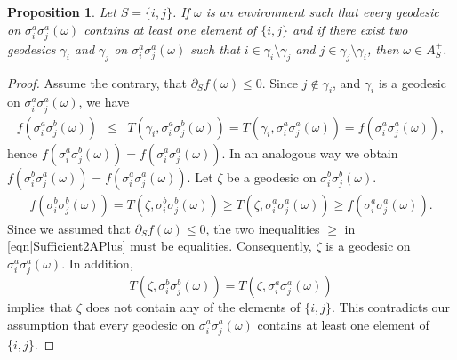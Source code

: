 \documentclass[reqno]{amsart}
\newtheorem{proposition}[theorem]{Proposition}
\begin{document}
\begin{proposition}\label{thm|Sufficient2APlus} 
Let $S=\{i,j\}$. If $\omega$ is an environment such that every geodesic on $\sigma_i^a\sigma_j^a(\omega)$ contains at least one element of $\{i,j\}$ and if there exist two geodesics $\gamma_i$ and $\gamma_j$ on $\sigma_i^a\sigma_j^a(\omega)$ such that $i\in \gamma_i\setminus \gamma_j$ and $j\in \gamma_j\setminus\gamma_i$, 
then $\omega\in A_{S}^+$.
\end{proposition}
\begin{proof} Assume the contrary, that $\partial_Sf(\omega)\leq 0$. Since $j\not\in \gamma_i$, and $\gamma_i$ is a geodesic on $\sigma_i^a\sigma_j^a(\omega)$, we have
\begin{eqnarray*}
f\left(\sigma_i^a\sigma_j^b(\omega)\right)&\leq& T\left(\gamma_i,\sigma_i^a\sigma_j^b(\omega)\right) =
 T\left(\gamma_i,\sigma_i^a\sigma_j^a(\omega)\right) =f\left(\sigma_i^a\sigma_j^a(\omega)\right),
\end{eqnarray*}
hence $f\left(\sigma_i^a\sigma_j^b(\omega)\right)=f\left(\sigma_i^a\sigma_j^a(\omega)\right)$. 
In an analogous way we obtain $f\left(\sigma_i^b\sigma_j^a(\omega)\right)=f\left(\sigma_i^a\sigma_j^a(\omega)\right)$.
Let $\zeta$ 
be a geodesic on
$\sigma_i^b\sigma_j^b(\omega)$. 
\begin{eqnarray}
f\left(\sigma_i^b\sigma_j^b(\omega)\right)=T\left(\zeta,\sigma_i^b\sigma_j^b(\omega)\right) \geq
T\left(\zeta,\sigma_i^a\sigma_j^a(\omega)\right) \geq   f\left(\sigma_i^a\sigma_j^a(\omega)\right).
\label{eqn|Sufficient2APlus}
\end{eqnarray}
Since we assumed that $\partial_Sf(\omega)\leq 0$, the two inequalities $\geq$ in \eqref{eqn|Sufficient2APlus} must be equalities. Consequently, $\zeta$ is a geodesic on $\sigma_i^a\sigma_j^a(\omega)$. In addition,  
\[T\left(\zeta,\sigma_i^b\sigma_j^b(\omega)\right) =
T\left(\zeta,\sigma_i^a\sigma_j^a(\omega)\right)\] 
implies that $\zeta$ does not contain any of the elements of $\{i,j\}$. This contradicts our assumption that every geodesic on $\sigma_i^a\sigma_j^a(\omega)$ contains at least one element of $\{i,j\}$. 
\end{proof}
\end{document}
